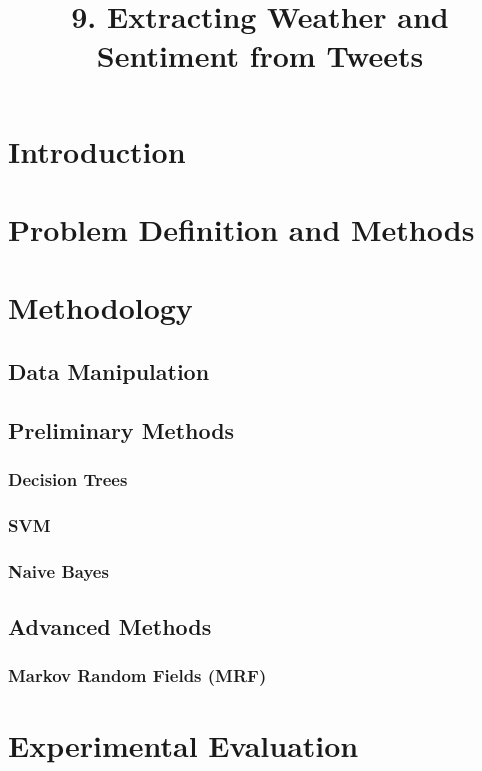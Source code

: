 \documentclass[a4paper,11pt]{article}
\title{9. Extracting Weather and Sentiment from Tweets}
\begin{document}
       \maketitle

\section{Introduction}



\section{Problem Definition and Methods}


\section{Methodology}
\subsection{Data Manipulation}


\subsection{Preliminary Methods}
\subsubsection{Decision Trees}


\subsubsection{SVM}


\subsubsection{Naive Bayes}


\subsection{Advanced Methods}

\subsubsection{Markov Random Fields (MRF)}

\section{Experimental Evaluation}
\end{document}
